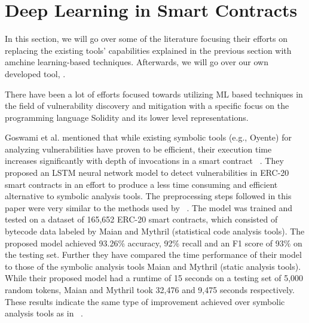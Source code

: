 \section{Deep Learning in Smart Contracts} \label{sec:dl-models}

In this section, we will go over some of the literature focusing their efforts on replacing the existing tools' capabilities explained in the previous section with amchine learning-based techniques.
Afterwards, we will go over our own developed tool, \slithersimil.

There have been a lot of efforts focused towards utilizing ML based techniques in the field of vulnerability discovery and mitigation with a specific focus on the programming language Solidity and
its lower level representations.

Goswami et al. mentioned that while existing symbolic tools (e.g., Oyente) for analyzing vulnerabilities have proven to be efficient, their execution time increases significantly with depth of invocations in a smart contract ~\cite{grech2019gigahorse}.
They proposed an LSTM neural network model to detect vulnerabilities in ERC-20 smart contracts in an effort to produce a less time consuming and efficient alternative to symbolic analysis tools.
The preprocessing steps followed in this paper were very similar to the methods used by ~\cite{madmax}.
The model was trained and tested on a dataset of 165,652 ERC-20 smart contracts, which consisted of bytecode data labeled by Maian and Mythril (statistical code analysis tools).
The proposed model achieved 93.26\% accuracy, 92\% recall and an F1 score of 93\% on the testing set.
Further they have compared the time performance of their model to those of the symbolic analysis tools Maian and Mythril (static analysis tools).
While their proposed model had a runtime of 15 seconds on a testing set of 5,000 random tokens, Maian and Mythril took 32,476 and 9,475 seconds respectively.
These results indicate the same type of improvement achieved over symbolic analysis tools as in ~\cite{grech2019gigahorse}.

